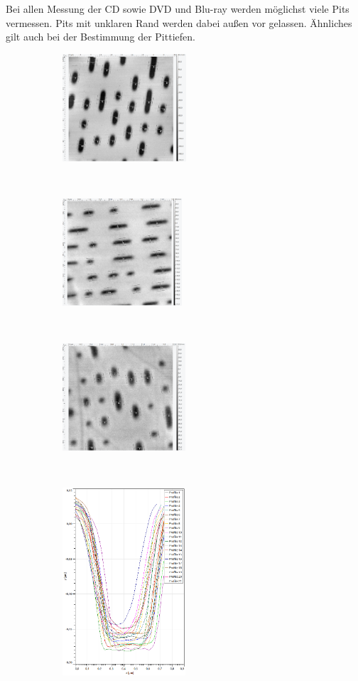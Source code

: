 Bei allen Messung der CD sowie DVD und Blu-ray werden m\"oglichst viele Pits vermessen.
Pits mit unklaren Rand werden dabei au{\ss}en vor gelassen.
\"Ahnliches gilt auch bei der Bestimmung der Pittiefen.
\begin{figure}[H]
\centering
	\begin{subfigure}[t]{0.3\textwidth}
	\includegraphics[height=4cm]{AFM_auswertung/cd_tiefe.png}
	\end{subfigure}
	~
	\begin{subfigure}[t]{0.3\textwidth}
	\includegraphics[height=4cm]{AFM_auswertung/dvd_tiefe.png}
	\end{subfigure}
	~
	\begin{subfigure}[t]{0.3\textwidth}
	\includegraphics[height=4cm]{AFM_auswertung/bluray_tiefe.png}
	\end{subfigure}
	\\
	\begin{subfigure}[t]{0.3\textwidth}
	\includegraphics[height=7cm]{AFM_auswertung/cd_tiefe_grafik.png}

\end{subfigure}
\end{figure}
